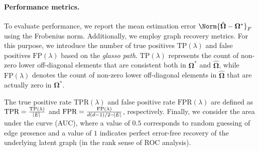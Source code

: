 \paragraph{Performance metrics.}
To evaluate performance, we report the mean estimation error $\Norm{\hat{\mathbf{\Omega}} - \mathbf\Omega^*}_F$ using the Frobenius norm. Additionally, we employ graph recovery metrics. For this purpose, we introduce the number of true positives $\text{TP}(\lambda)$ and false positives $\text{FP}(\lambda)$ based on the \textit{glasso path}. $\text{TP}(\lambda)$ represents the count of non-zero lower off-diagonal elements that are consistent both in $\mathbf\Omega^*$ and $\hat{\mathbf\Omega}$, while $\text{FP}(\lambda)$ denotes the count of non-zero lower off-diagonal elements in $\hat{\mathbf\Omega}$ that are actually zero in $\mathbf\Omega^*$.

The true positive rate $\text{TPR}(\lambda)$ and false positive rate $\text{FPR}(\lambda)$ are defined as $\text{TPR} = \frac{\text{TP}(\lambda)}{\abs{E}}$ and $\text{FPR} = \frac{\text{FP}(\lambda)}{d(d-1)/2 - \abs{E}}$, respectively. Finally, we consider the area under the curve (AUC), where a value of $0.5$ corresponds to random guessing of edge presence and a value of $1$ indicates perfect error-free recovery of the underlying latent graph (in the rank sense of ROC analysis).